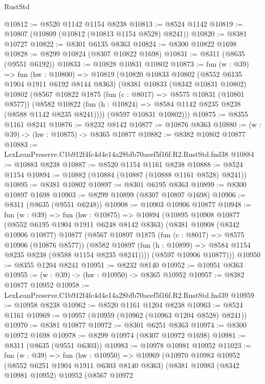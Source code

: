 \begin{lexlean}{RustStd}
\begin{coremodule}
@10812 := @8520 @1142 @1154 @8238
@10813 := @8524 @1142
@10819 := @10807 (@10809 (@10812 (@10813 @1154 @8528) @8241))
@10820 := @8381 @10727
@10822 := @8301 @6135 @8363
@10824 := @8300 @10822 @1698
@10828 := @8299 @10824 (@8307 @10822 @1698)
@10831 := @8311 (@8635 (@9551 @6192))
@10833 := @10828 @10831 @10802
@10873 := fun (w : @39) =>
  fun (hw : @10800) =>
  @10819
    (@10820
      @10833
      @10802
      (@8552 @6135 @1904 @1911 @6192 @8144 @8363)
      (@8381
        @10833
        (@8342 @10831 @10802)
        @10802
        (@8567
          @10822
          @1875
          (fun (c : @8017) => @8575 @10831 (@10801 @8577))
          (@8582 @10822 (fun (h : @10824) => @8584 @1142 @8235 @8238 (@8588 @1142 @8235 @8241))))
        (@8597 @10831 @10802)))
@10875 := @8355 @1161 @8241
@10876 := @8232 @8142
@10877 := @10876 @8363
@10880 := (w : @39) -> (hw : @10875) -> @8365 @10877
@10882 := @8382 @10802 @10877
@10883 := LexLeanPreserve.C1b912f4fc4d4e14a28bfb70aeef5f16f.R2.RustStd.fnd38
@10884 := @10883 @8238
@10887 := @8520 @1154 @1161 @8238
@10888 := @8524 @1154
@10894 := @10882 (@10884 (@10887 (@10888 @1161 @8528) @8241))
@10895 := @8381 @10802
@10897 := @8301 @6195 @8363
@10899 := @8300 @10897 @1698
@10903 := @8299 @10899 (@8307 @10897 @1698)
@10906 := @8311 (@8635 (@9551 @6248))
@10908 := @10903 @10906 @10877
@10948 := fun (w : @39) =>
  fun (hw : @10875) =>
  @10894
    (@10895
      @10908
      @10877
      (@8552 @6195 @1904 @1911 @6248 @8142 @8363)
      (@8381
        @10908
        (@8342 @10906 @10877)
        @10877
        (@8567
          @10897
          @1875
          (fun (c : @8017) => @8575 @10906 (@10876 @8577))
          (@8582 @10897 (fun (h : @10899) => @8584 @1154 @8235 @8238 (@8588 @1154 @8235 @8241))))
        (@8597 @10906 @10877)))
@10950 := @8355 @1204 @8241
@10951 := @8232 @8140
@10952 := @10951 @8363
@10955 := (w : @39) -> (hw : @10950) -> @8365 @10952
@10957 := @8382 @10877 @10952
@10958 := LexLeanPreserve.C1b912f4fc4d4e14a28bfb70aeef5f16f.R2.RustStd.fnd39
@10959 := @10958 @8238
@10962 := @8520 @1161 @1204 @8238
@10963 := @8524 @1161
@10969 := @10957 (@10959 (@10962 (@10963 @1204 @8528) @8241))
@10970 := @8381 @10877
@10972 := @8301 @6251 @8363
@10974 := @8300 @10972 @1698
@10978 := @8299 @10974 (@8307 @10972 @1698)
@10981 := @8311 (@8635 (@9551 @6303))
@10983 := @10978 @10981 @10952
@11023 := fun (w : @39) =>
  fun (hw : @10950) =>
  @10969
    (@10970
      @10983
      @10952
      (@8552 @6251 @1904 @1911 @6303 @8140 @8363)
      (@8381
        @10983
        (@8342 @10981 @10952)
        @10952
        (@8567
          @10972

\end{coremodule}
\end{lexlean}
